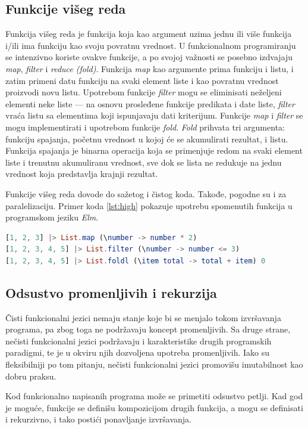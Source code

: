 \documentclass[12pt,oneside]{memoir}
\begin{document}
\subsection{Funkcije višeg reda}
\par Funkcija višeg reda je funkcija koja kao argument uzima jednu ili više funkcija i/ili ima funkciju kao svoju povratnu vrednost. U funkcionalnom programiranju se intenzivno koriste ovakve funkcije, a po svojoj važnosti se posebno izdvajaju \textit{map}, \textit{filter} i \textit{reduce (fold)}.  Funkcija \textit{map} kao argumente prima funkciju i listu, i zatim primeni datu funkciju na svaki element liste i kao povratnu vrednost proizvodi novu listu. Upotrebom funkcije \textit{filter} mogu se eliminisati neželjeni elementi neke liste --- na osnovu prosleđene funkcije predikata i date liste, \textit{filter} vraća listu sa elementima koji ispunjavaju dati kriterijum. Funkcije \emph{map} i \emph{filter} se mogu implementirati i upotrebom funkcije \emph{fold}. \textit{Fold} prihvata tri argumenta: funkciju spajanja, početnu vrednost u kojoj će se akumulirati rezultat, i listu. Funkcija spajanja je binarna operacija koja se primenjuje redom na svaki element liste i trenutnu akumuliranu vrednost, sve dok se lista ne redukuje na jednu vrednost koja predstavlja krajnji rezultat. 
\par Funkcije višeg reda dovode do sažetog i čistog koda. Takođe, pogodne su i za paralelizaciju. Primer koda \ref{lst:high} pokazuje upotrebu spomenutih funkcija u programskom jeziku \emph{Elm}.

\vspace*{1\baselineskip}

\begin{minipage}{\linewidth}
\begin{lstlisting}[language=elm, basicstyle=\small, caption={Funkcije višeg reda},captionpos=b, label={lst:high}]
[1, 2, 3] |> List.map (\number -> number * 2) 
[1, 2, 3, 4, 5] |> List.filter (\number -> number <= 3) 
[1, 2, 3, 4, 5] |> List.foldl (\item total -> total + item) 0 
\end{lstlisting}
\end{minipage}

\subsection{Odsustvo promenljivih i rekurzija}
\par Čisti funkcionalni jezici nemaju stanje koje bi se menjalo tokom izvršavanja programa, pa zbog toga ne podržavaju koncept promenljivih. Sa druge strane, nečisti funkcionalni jezici podržavaju i karakteristike drugih programskih paradigmi, te je u okviru njih dozvoljena upotreba promenljivih. Iako su fleksibilniji po tom pitanju, nečisti funkcionalni jezici promovišu imutabilnost kao dobru praksu. 
\par Kod funkcionalno napisanih programa može se primetiti odsustvo petlji. Kad god je moguće, funkcije se definišu kompozicijom drugih funkcija, a mogu se definisati i rekurzivno, i tako postići ponavljanje izvršavanja.
\end{document}
